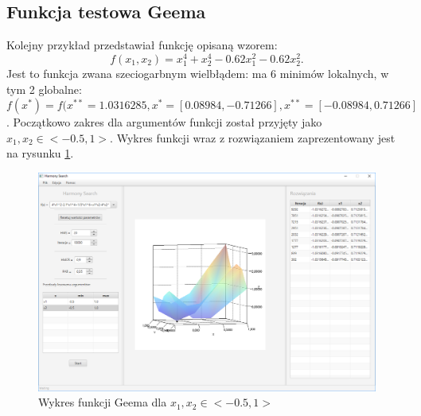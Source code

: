 \documentclass[10pt, a4paper]{article}
\begin{document}
\subsection{Funkcja testowa Geema}
\label{subsec:gemm}
Kolejny przykład przedstawiał funkcję opisaną wzorem: $$f(x_{1},x_{2}) = x_{1}^{4}+x_{2}^{4}-0.62x_{1}^{2}-0.62x_{2}^{2}.$$ Jest to funkcja zwana szeciogarbnym wielbłądem: ma 6 minimów lokalnych, w tym 2 globalne: $f(x^*)=f(x^{**}=1.0316285, x^{*} = [ 0.08984, -0.71266], x^{**} = [- 0.08984, 0.71266]$. Początkowo zakres dla argumentów funkcji został przyjęty jako $x_{1},x_{2} \in <-0.5,1>$. Wykres funkcji wraz z rozwiązaniem zaprezentowany jest na rysunku \ref{fig:21}. 
\begin{figure}[htbp]
	\centering
	\includegraphics[width=1\textwidth]{images/21.PNG}
	\caption{Wykres funkcji Geema dla $x_{1}, x_{2} \in <-0.5,1>$}
	\label{fig:21}
\end{figure}
\end{document}
